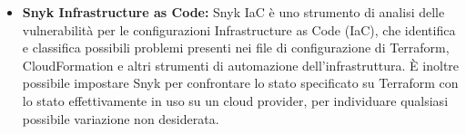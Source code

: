 \begin{itemize}
   \item \textbf{Snyk Infrastructure as Code:} Snyk IaC è uno strumento di analisi delle vulnerabilità per le configurazioni Infrastructure as Code (IaC), che identifica e classifica possibili problemi presenti nei file di configurazione di Terraform, CloudFormation e altri strumenti di automazione dell'infrastruttura. È inoltre possibile impostare Snyk per confrontare lo stato specificato su Terraform con lo stato effettivamente in uso su un cloud provider, per individuare qualsiasi possibile variazione non desiderata.

\end{itemize}